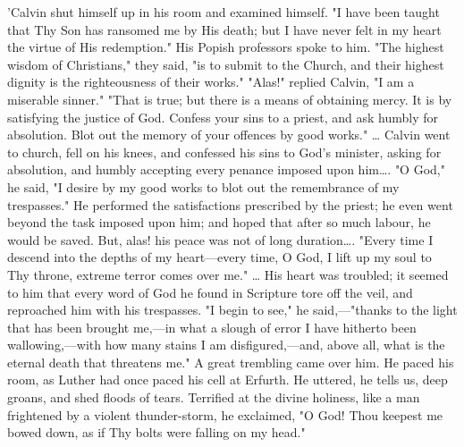 \documentclass[
]{book}
\begin{document}
{  'Calvin shut himself up in his room and examined himself. "I have been taught that Thy Son has ransomed me by His death; but I have never felt in my heart the virtue of His redemption." His Popish professors spoke to him. "The highest wisdom of Christians," they said, "is to submit to the Church, and their highest dignity is the righteousness of their works." "Alas!" replied Calvin, "I am a miserable sinner." "That is true; but there is a means of obtaining mercy. It is by satisfying the justice of God. Confess your sins to a priest, and ask humbly for absolution. Blot out the memory of your offences by good works." \ldots{} Calvin went to church, fell on his knees, and confessed his sins to God's minister, asking for absolution, and humbly accepting every penance imposed upon him\ldots. "O God," he said, "I desire by my good works to blot out the remembrance of my trespasses." He performed the satisfactions prescribed by the priest; he even went beyond the task imposed upon him; and hoped that after so much labour, he would be saved. But, alas! his peace was not of long duration\ldots. "Every time I descend into the depths of my heart---every time, O God, I lift up my soul to Thy throne, extreme terror comes over me." \ldots{} His heart was troubled; it seemed to him that every word of God he found in Scripture tore off the veil, and reproached him with his trespasses. "I begin to see," he said,---"thanks to the light that has been brought me,---in what a slough of error I have hitherto been wallowing,---with how many stains I am disfigured,---and, above all, what is the eternal death that threatens me." A great trembling came over him. He paced his room, as Luther had once paced his cell at Erfurth. He uttered, he tells us, deep groans, and shed floods of tears. Terrified at the divine holiness, like a man frightened by a violent thunder-storm, he exclaimed, "O God! Thou keepest me bowed down, as if Thy bolts were falling on my head."

}
\end{document}
